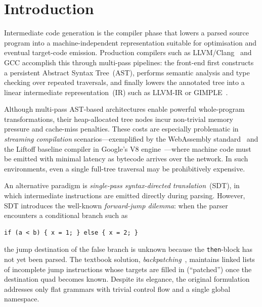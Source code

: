 \documentclass[conference]{IEEEtran}
\begin{document}
\section{Introduction}

Intermediate code generation is the compiler phase that lowers a parsed source program into a machine-independent representation suitable for optimisation and eventual target-code emission. Production compilers such as LLVM/Clang~\cite{llvm} and GCC accomplish this through multi-pass pipelines: the front-end first constructs a persistent Abstract Syntax Tree~(AST), performs semantic analysis and type checking over repeated traversals, and finally lowers the annotated tree into a linear intermediate representation~(IR) such as LLVM-IR or GIMPLE~\cite{dragonbook,llvm}.

Although multi-pass AST-based architectures enable powerful whole-program transformations, their heap-allocated tree nodes incur non-trivial memory pressure and cache-miss penalties. These costs are especially problematic in \emph{streaming compilation} scenarios---exemplified by the WebAssembly standard~\cite{wasmhaas} and the Liftoff baseline compiler in Google's V8 engine~\cite{v8liftoff}---where machine code must be emitted with minimal latency as bytecode arrives over the network. In such environments, even a single full-tree traversal may be prohibitively expensive.

An alternative paradigm is \emph{single-pass syntax-directed translation}~(SDT), in which intermediate instructions are emitted directly during parsing. However, SDT introduces the well-known \emph{forward-jump dilemma}: when the parser encounters a conditional branch such as
\begin{lstlisting}
if (a < b) { x = 1; } else { x = 2; }
\end{lstlisting}
the jump destination of the false branch is unknown because the \texttt{then}-block has not yet been parsed. The textbook solution, \emph{backpatching}~\cite{dragonbook}, maintains linked lists of incomplete jump instructions whose targets are filled in (``patched'') once the destination quad becomes known. Despite its elegance, the original formulation addresses only flat grammars with trivial control flow and a single global namespace.
\end{document}

